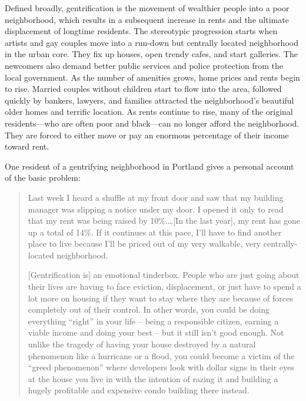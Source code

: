 Defined broadly, gentrification is the movement of
wealthier people into a poor neighborhood, which results in a subsequent
increase in rents and the ultimate displacement of longtime residents.  The
stereotypic progression starts when artists and gay couples move into a
run-down but centrally located neighborhood in the urban core.  They fix up
houses, open trendy cafes, and start galleries.  The newcomers also demand
better public services and police protection from the local government.  As the
number of amenities grows, home prices and rents begin to rise.  Married
couples without children start to flow into the area, followed quickly by
bankers, lawyers, and families attracted the neighborhood's beautiful older
homes and terrific location.  As rents continue to rise, many of the original
residents---who are often poor and black---can no longer afford the
neighborhood.  They are forced to either move or pay an enormous percentage of
their income toward rent.  


One resident of a gentrifying neighborhood in Portland gives a personal account
of the basic problem: 
\begin{quotation}
Last week I heard a shuffle at my front door and saw that my building manager
was slipping a notice under my door. I opened it only to read that my rent was
being raised by 10\%.\ldots [In the last year], my rent has gone up a total of
14\%. If it continues at this pace, I'll have to find another place to live
because I'll be priced out of my very walkable, very centrally-located
neighborhood.

[Gentrification is] an emotional tinderbox. People who are just going about
their lives are having to face eviction, displacement, or just have to spend a
lot more on housing if they want to stay where they are because of forces
completely out of their control. In other words, you could be doing everything
``right'' in your life -- being a responsible citizen, earning a viable income
and doing your best -- but it still isn't good enough. Not unlike the tragedy
of having your house destroyed by a natural phenomenon like a hurricane or a
flood, you could become a victim of the ``greed phenomenon'' where developers
look with dollar signs in their eyes at the house you live in with the
intention of razing it and building a hugely profitable and expensive condo
building there instead.
\end{quotation}

